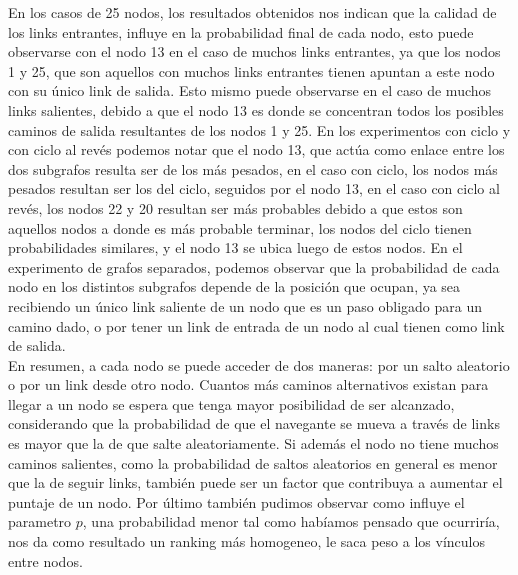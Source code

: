 En los casos de 25 nodos, los resultados obtenidos nos indican que la calidad de los links entrantes, influye en la probabilidad final de cada nodo, esto puede observarse con el nodo 13 en el caso de muchos links entrantes, ya que los nodos 1 y 25, que son aquellos con muchos links entrantes tienen apuntan a este nodo con su \'unico link de salida. Esto mismo puede observarse en el caso de muchos links salientes, debido a que el nodo 13 es donde se concentran todos los posibles caminos de salida resultantes de los nodos 1 y 25.
En los experimentos con ciclo y con ciclo al rev\'es podemos notar que el nodo 13, que act\'ua como enlace entre los dos subgrafos resulta ser de los m\'as pesados, en el caso con ciclo, los nodos m\'as pesados resultan ser los del ciclo, seguidos por el nodo 13, en el caso con ciclo al rev\'es, los nodos 22 y 20 resultan ser m\'as probables debido a que estos son aquellos nodos a donde es m\'as probable terminar, los nodos del ciclo tienen probabilidades similares, y el nodo 13 se ubica luego de estos nodos.
En el experimento de grafos separados, podemos observar que la probabilidad de cada nodo en los distintos subgrafos depende de la posici\'on que ocupan, ya sea recibiendo un \'unico link saliente de un nodo que es un paso obligado para un camino dado, o por tener un link de entrada de un nodo al cual tienen como link de salida.\\

En resumen, a cada nodo se puede acceder de dos maneras: por un salto aleatorio o por un link desde otro nodo. Cuantos más caminos alternativos existan para llegar a un nodo se espera que tenga mayor posibilidad de ser alcanzado, considerando que la probabilidad de que el navegante se mueva a través de links es mayor que la de que salte aleatoriamente. Si además el nodo no tiene muchos caminos salientes, como la probabilidad de saltos aleatorios en general es menor que la de seguir links, también puede ser un factor que contribuya a aumentar el puntaje de un nodo.
Por \'ultimo tambi\'en pudimos observar como influye el parametro $p$, una probabilidad menor tal como hab\'iamos pensado que ocurrir\'ia, nos da como resultado un ranking m\'as homogeneo, le saca peso a los v\'inculos entre nodos.